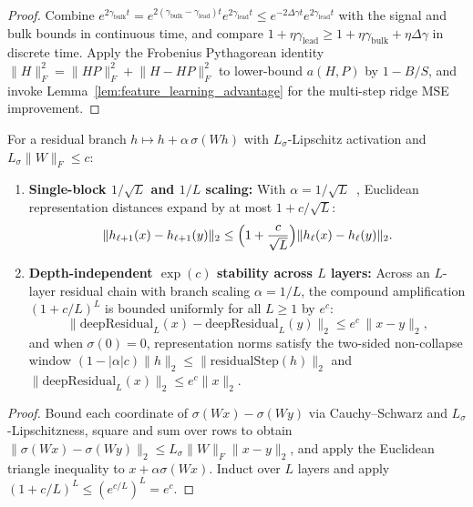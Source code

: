\begin{proof}
\leanok
Combine $e^{2\gamma_{\mathrm{bulk}}t} = e^{2(\gamma_{\mathrm{bulk}}-\gamma_{\mathrm{lead}})t} e^{2\gamma_{\mathrm{lead}}t} \le e^{-2\Delta\gamma t} e^{2\gamma_{\mathrm{lead}}t}$ with the signal and bulk bounds in continuous time, and compare $1+\eta\gamma_{\mathrm{lead}} \ge 1+\eta\gamma_{\mathrm{bulk}} + \eta\Delta\gamma$ in discrete time. Apply the Frobenius Pythagorean identity $\lVert H\rVert_F^2 = \lVert HP\rVert_F^2 + \lVert H-HP\rVert_F^2$ to lower-bound $a(H,P)$ by $1 - B/S$, and invoke Lemma~\ref{lem:feature_learning_advantage} for the multi-step ridge MSE improvement.
\end{proof}

\begin{lemma}\label{lem:representation_contraction}
\leanok
{}
For a residual branch $h \mapsto h + \alpha\,\sigma(Wh)$ with $L_\sigma$-Lipschitz activation and $L_\sigma\|W\|_F \le c$:
\begin{enumerate}
\item \textbf{Single-block $1/\sqrt{L}$ and $1/L$ scaling:} With $\alpha = 1/\sqrt{L}$~\cite{hayou2021stable}, Euclidean representation distances expand by at most $1 + c/\sqrt{L}$:
\[
\|h_{\ell+1}(x)-h_{\ell+1}(y)\|_2
\le
\Bigl(1+\frac{c}{\sqrt{L}}\Bigr)
\|h_\ell(x)-h_\ell(y)\|_2.
\]
\item \textbf{Depth-independent $\exp(c)$ stability across $L$ layers:} Across an $L$-layer residual chain with branch scaling $\alpha = 1/L$, the compound amplification $(1 + c/L)^L$ is bounded uniformly for all $L\ge 1$ by $e^c$:
\[
\bigl\|\mathrm{deepResidual}_L(x) - \mathrm{deepResidual}_L(y)\bigr\|_2 \le e^c\,\|x - y\|_2,
\]
and when $\sigma(0)=0$, representation norms satisfy the two-sided non-collapse window $(1 - |\alpha|c)\|h\|_2 \le \|\mathrm{residualStep}(h)\|_2$ and $\|\mathrm{deepResidual}_L(x)\|_2 \le e^c\|x\|_2$.
\end{enumerate}
\end{lemma}
\begin{proof}
\leanok
Bound each coordinate of $\sigma(Wx)-\sigma(Wy)$ via Cauchy--Schwarz and $L_\sigma$-Lipschitzness, square and sum over rows to obtain $\|\sigma(Wx)-\sigma(Wy)\|_2 \le L_\sigma\|W\|_F\|x-y\|_2$, and apply the Euclidean triangle inequality to $x + \alpha\sigma(Wx)$. Induct over $L$ layers and apply $(1+c/L)^L \le (e^{c/L})^L = e^c$.
\end{proof}

